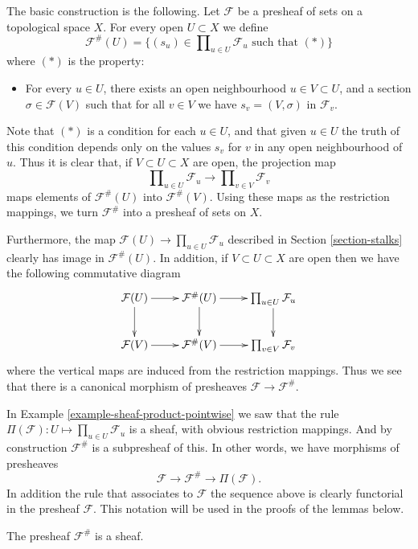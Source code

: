 \medskip\noindent
The basic construction is the following. Let $\mathcal{F}$ be a presheaf
of sets on a topological space $X$.
For every open $U \subset X$ we define
$$
\mathcal{F}^{\#}(U)
=
\{
(s_u) \in \prod\nolimits_{u \in U} \mathcal{F}_u
\text{ such that }(*)
\}
$$
where $(*)$ is the property:
\begin{itemize}
\item[(*)] For every $u \in U$, there exists an open neighbourhood
$u \in V \subset U$, and a section $\sigma \in \mathcal{F}(V)$
such that for all $v \in V$ we have $s_v = (V, \sigma)$
in $\mathcal{F}_v$.
\end{itemize}
Note that $(*)$ is a condition for each $u \in U$,
and that given $u \in U$ the truth of this condition
depends only on the values $s_v$ for $v$ in any open neighbourhood
of $u$. Thus it is clear that,
if $V \subset U \subset X$ are open, the projection map
$$
\prod\nolimits_{u \in U} \mathcal{F}_u
\longrightarrow
\prod\nolimits_{v \in V} \mathcal{F}_v
$$
maps elements of $\mathcal{F}^{\#}(U)$ into $\mathcal{F}^{\#}(V)$.
Using these maps as the restriction mappings, we turn $\mathcal{F}^\#$
into a presheaf of sets on $X$.

\medskip\noindent
Furthermore, the map $\mathcal{F}(U) \to \prod_{u \in U} \mathcal{F}_u$
described in Section \ref{section-stalks} clearly has image
in $\mathcal{F}^{\#}(U)$. In addition, if $V \subset U \subset X$ are
open then we have the following commutative diagram
$$
\xymatrix{
\mathcal{F}(U) \ar[r] \ar[d] &
\mathcal{F}^{\#}(U) \ar[r] \ar[d] &
\prod_{u\in U} \mathcal{F}_u \ar[d] \\
\mathcal{F}(V) \ar[r] &
\mathcal{F}^{\#}(V) \ar[r] &
\prod_{v\in V} \mathcal{F}_v
}
$$
where the vertical maps are induced from the
restriction mappings. Thus we see that
there is a canonical morphism of presheaves
$\mathcal{F} \to \mathcal{F}^{\#}$.

\medskip\noindent
In Example \ref{example-sheaf-product-pointwise} we saw
that the rule $\Pi(\mathcal{F}) : U \mapsto \prod_{u\in U} \mathcal{F}_u$
is a sheaf, with obvious restriction mappings. And by construction
$\mathcal{F}^{\#}$ is a subpresheaf of this. In other words, we
have morphisms of presheaves
$$
\mathcal{F} \to \mathcal{F}^\# \to \Pi(\mathcal{F}).
$$
In addition the rule that associates to $\mathcal{F}$
the sequence above is clearly functorial in the presheaf $\mathcal{F}$.
This notation will be
used in the proofs of the lemmas below.

\begin{lemma}
\label{lemma-sheafification-sheaf}
The presheaf $\mathcal{F}^{\#}$ is a sheaf.
\end{lemma}


